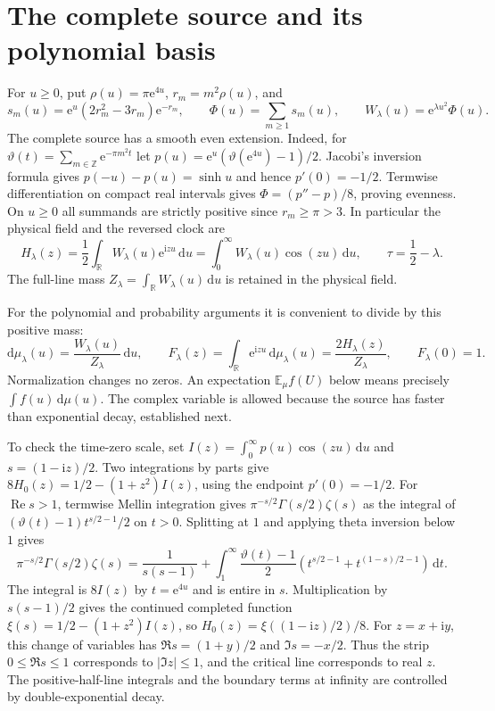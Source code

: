 \documentclass[11pt]{article}
\numberwithin{equation}{section}
\newcommand{\e}{\mathrm e}
\newcommand{\ii}{\mathrm i}
\newcommand{\dd}{\mathrm d}
\newcommand{\R}{\mathbb R}
\begin{document}
\section{The complete source and its polynomial basis}
\label{sec:source}

For \(u\ge0\), put \(\rho(u)=\pi\e^{4u}\), \(r_m=m^2\rho(u)\), and
\begin{equation}
 s_m(u)=\e^u(2r_m^2-3r_m)\e^{-r_m},\qquad
 \Phi(u)=\sum_{m\ge1}s_m(u),\qquad W_\lambda(u)=\e^{\lambda u^2}\Phi(u).
 \label{eq:source}
\end{equation}
The complete source has a smooth even extension. Indeed, for
\(\vartheta(t)=\sum_{m\in\mathbb Z}\e^{-\pi m^2t}\) let
\(p(u)=\e^u(\vartheta(\e^{4u})-1)/2\).
Jacobi's inversion formula \cite[Eqs.~20.2.3 and 20.7.32]{dlmf}
gives \(p(-u)-p(u)=\sinh u\) and hence \(p'(0)=-1/2\).
Termwise differentiation on compact real intervals gives
\(\Phi=(p''-p)/8\), proving evenness. On \(u\ge0\) all
summands are strictly positive since \(r_m\ge\pi>3\).
In particular the physical field and the reversed clock are
\begin{equation}
 H_\lambda(z)=\frac12\int_\R W_\lambda(u)\e^{\ii zu}\,\dd u
      =\int_0^\infty W_\lambda(u)\cos(zu)\,\dd u,\qquad
 \tau=\frac12-\lambda .
 \label{eq:field}
\end{equation}
The full-line mass \(Z_\lambda=\int_\R W_\lambda(u)\,\dd u\) is retained in
the physical field.

For the polynomial and probability arguments it is convenient to
divide by this positive mass:
\begin{equation}
 \dd\mu_\lambda(u)=\frac{W_\lambda(u)}{Z_\lambda}\,\dd u,\qquad
 F_\lambda(z)=\int_\R\e^{\ii zu}\,\dd\mu_\lambda(u)
             =\frac{2H_\lambda(z)}{Z_\lambda},\qquad F_\lambda(0)=1.
 \label{eq:normalized-field}
\end{equation}
Normalization changes no zeros. An expectation
\(\mathbb E_\mu f(U)\) below means precisely \(\int f(u)\,\dd\mu(u)\).
The complex variable is allowed because the source has faster than
exponential decay, established next.

To check the time-zero scale, set \(I(z)=\int_0^\infty p(u)\cos(zu)\,\dd u\)
and \(s=(1-\ii z)/2\). Two integrations by parts give
\(8H_0(z)=1/2-(1+z^2)I(z)\), using the endpoint \(p'(0)=-1/2\).
For \(\operatorname{Re}s>1\), termwise Mellin integration gives
\(\pi^{-s/2}\Gamma(s/2)\zeta(s)\) as the integral of
\((\vartheta(t)-1)t^{s/2-1}/2\) on \(t>0\). Splitting at \(1\)
and applying theta inversion below \(1\) gives
\[
 \pi^{-s/2}\Gamma(s/2)\zeta(s)=\frac{1}{s(s-1)}
  +\int_1^\infty\frac{\vartheta(t)-1}{2}
       (t^{s/2-1}+t^{(1-s)/2-1})\,\dd t .
\]
The integral is \(8I(z)\) by \(t=\e^{4u}\) and is entire in \(s\).
Multiplication by \(s(s-1)/2\) gives the continued completed function
\(\xi(s)=1/2-(1+z^2)I(z)\), so \(H_0(z)=\xi((1-\ii z)/2)/8\).
For \(z=x+\ii y\), this change of variables has
\(\Re s=(1+y)/2\) and \(\Im s=-x/2\). Thus the strip
\(0\le\Re s\le1\) corresponds to \(|\Im z|\le1\), and the
critical line corresponds to real \(z\).
The positive-half-line integrals and the boundary terms at infinity
are controlled by double-exponential decay.
\end{document}
